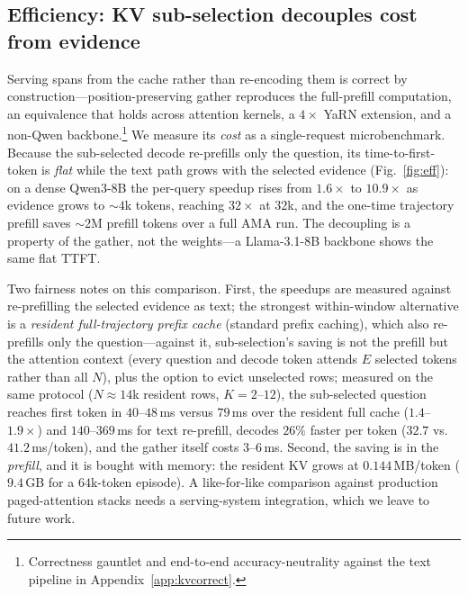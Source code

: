 \documentclass{article} %
\begin{document}
\subsection{Efficiency: KV sub-selection decouples cost from evidence}
\label{sec:eff}

Serving spans from the cache rather than re-encoding them is correct by
construction---position-preserving gather reproduces the full-prefill computation,
an equivalence that holds across attention kernels, a $4\times$ YaRN extension, and a
non-Qwen backbone.\footnote{Correctness gauntlet and end-to-end accuracy-neutrality
against the text pipeline in Appendix~\ref{app:kvcorrect}.} We measure its
\emph{cost} as a single-request microbenchmark. Because the sub-selected decode
re-prefills only the question, its time-to-first-token is \emph{flat} while the text
path grows with the selected evidence (Fig.~\ref{fig:eff}): on a dense Qwen3-8B the
per-query speedup rises from $1.6\times$ to $10.9\times$ as evidence grows to
$\sim\!4$k tokens, reaching $32\times$ at $32$k, and the one-time trajectory prefill
saves $\sim\!2$M prefill tokens over a full AMA run. The decoupling is a property of
the gather, not the weights---a Llama-3.1-8B backbone shows the same flat TTFT.

Two fairness notes on this comparison. First, the speedups are measured against
re-prefilling the selected evidence as text; the strongest within-window alternative is
a \emph{resident full-trajectory prefix cache} (standard prefix caching), which also
re-prefills only the question---against it, sub-selection's saving is not the prefill
but the attention context (every question and decode token attends $E$ selected tokens
rather than all $N$), plus the option to evict unselected rows; measured on the same
protocol ($N{\approx}14$k resident rows, $K{=}2$--$12$), the sub-selected question
reaches first token in $40$--$48$\,ms versus $79$\,ms over the resident full cache
($1.4$--$1.9\times$) and $140$--$369$\,ms for text re-prefill, decodes $26\%$ faster
per token ($32.7$ vs.\ $41.2$\,ms/token), and the gather itself costs $3$--$6$\,ms. Second,
the saving is in the \emph{prefill}, and it is bought with memory: the resident KV
grows at $0.144$\,MB/token ($9.4$\,GB for a $64$k-token episode). A like-for-like
comparison against production paged-attention stacks needs a serving-system
integration, which we leave to future work.
\end{document}
